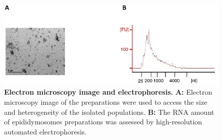 \documentclass[12pt,twoside]{reedthesis}
\begin{document}
\begin{figure}[htbp]

{\centering \includegraphics{thesis_files/figure-latex/es1-1} 

}

\caption[Electron microscopy image and electrophoresis]{\textbf{Electron microscopy image and electrophoresis.} \newline \textbf{A:} Electron microscopy image of the preparations were used to access the size and heterogeneity of the isolated populations. \newline \textbf{B:} The RNA amount of epididymosomes preparations was assessed by high-resolution automated electrophoresis.}\label{fig:es1}
\end{figure}
\end{document}
